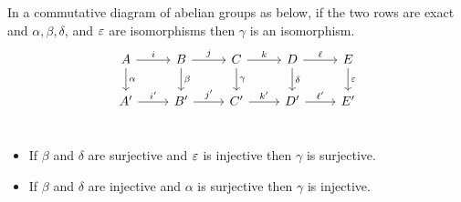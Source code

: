 
%

\begin{lemma}\label{lem:five}
  In a commutative diagram of abelian groups as below, if the two rows are exact and $\alpha,\beta,\delta$, and $\varepsilon$ are isomorphisms then $\gamma$ is an isomorphism.
  \[\begin{tikzcd}
      A\ar[r, "i"]\ar[d, "\alpha"]
    & B\ar[r, "j"]\ar[d, "\beta"]
    & C\ar[r, "k"]\ar[d, "\gamma"]
    & D\ar[r, "\ell"]\ar[d, "\delta"]
    & E\ar[d, "\e"]\\
      A'\ar[r, "i'"]
    & B'\ar[r, "j'"]
    & C'\ar[r, "k'"]
    & D'\ar[r, "\ell'"]
    & E'\\
  \end{tikzcd}\]

  \begin{itemize}
    \item If $\beta$ and $\delta$ are surjective and $\varepsilon$ is injective then $\gamma$ is surjective.
    \item If $\beta$ and $\delta$ are injective and $\alpha$ is surjective then $\gamma$ is injective.
  \end{itemize}
\end{lemma}

